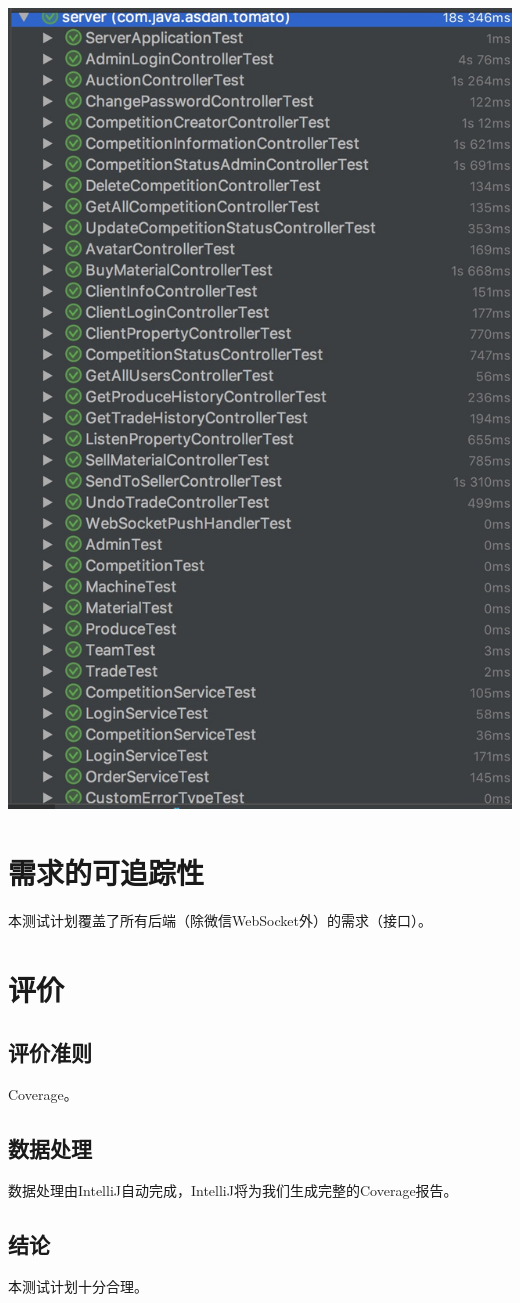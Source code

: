 \documentclass{article}
\begin{document}
			\includegraphics[scale = .3]{fig/test_total_time.jpeg}
		\section{需求的可追踪性}
			本测试计划覆盖了所有后端（除微信WebSocket外）的需求（接口）。
		\section{评价}
			\subsection{评价准则}
				Coverage。
			\subsection{数据处理}
				数据处理由IntelliJ自动完成，IntelliJ将为我们生成完整的Coverage报告。
			\subsection{结论}
				本测试计划十分合理。
\end{document}
